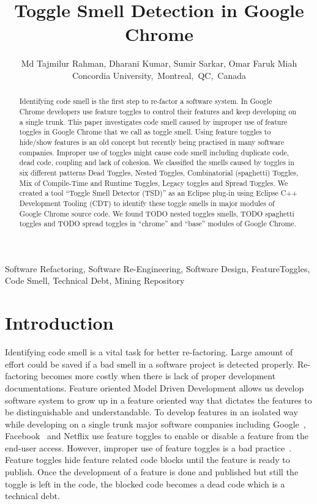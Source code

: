 \documentclass[conference]{IEEEtran}
\begin{document}
\title{Toggle Smell Detection in Google Chrome}
\author{
Md Tajmilur Rahman, Dharani Kumar, Sumir Sarkar, Omar Faruk Miah\\
Concordia University,~Montreal,~QC,~Canada
}
\maketitle

\begin{abstract}
Identifying code smell is the first step to re-factor a software system. 
In Google Chrome developers use feature toggles to control their features 
and keep developing on a single trunk. This paper investigates code smell 
caused by improper use of feature toggles in Google Chrome that we call 
as toggle smell. Using feature toggles to hide/show features is an old 
concept but recently being practised in many software companies. Improper 
use of toggles might cause code smell including duplicate code, dead code, 
coupling and lack of cohesion. We classified the smells caused by toggles 
in six different patterns Dead Toggles, Nested Toggles, Combinatorial (spaghetti) Toggles, 
Mix of Compile-Time and Runtime Toggles, Legacy toggles and Spread Toggles. 
We created a tool ``Toggle Smell Detector (TSD)'' as an Eclipse plug-in using Eclipse C++ Development Tooling (CDT) to identify these toggle 
smells in major modules of Google Chrome source code. We found TODO 
nested toggles smells, TODO spaghetti toggles and TODO spread toggles in ``chrome'' and ``base'' modules of Google Chrome.\\
\end{abstract}

\begin{IEEEkeywords}
Software Refactoring, Software Re-Engineering, Software Design, FeatureToggles, Code Smell, Technical Debt, Mining Repository
\end{IEEEkeywords}

\section{Introduction}
Identifying code smell is a vital task for better re-factoring. Large amount of effort could be saved if a bad smell in a software project is detected properly. Re-factoring becomes more costly when there is lack of proper development documentations. Feature oriented Model Driven Development allows us develop software system to grow up in a feature oriented way that dictates the features to be distinguishable and understandable. To develop features in an isolated way while developing on a single trunk major software companies including Google~\cite{ChromeRepidRelease}, Facebook~\cite{Rossi2014Google} and Netflix use feature toggles to enable or disable a feature from the end-user access. However, improper use of feature toggles is a bad practice~\cite{Fowler2010FeatureToggle}. Feature toggles hide feature 
related code blocks until the feature is ready to publish. Once the 
development of a feature is done and published but still the toggle is 
left in the code, the blocked code becomes a dead code which is a technical 
debt.\\
\end{document}
